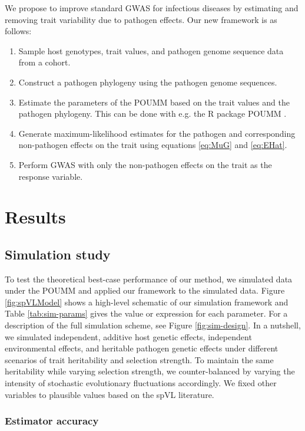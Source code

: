 \documentclass[11pt]{article}
\begin{document}
\begin{linenumbers}
We propose to improve standard GWAS for infectious diseases by estimating and removing trait variability due to pathogen effects. Our new framework is as follows:

\begin{enumerate}
	\item Sample host genotypes, trait values, and pathogen genome sequence data from a cohort.
	\item Construct a pathogen phylogeny using the pathogen genome sequences.
	\item Estimate the parameters of the POUMM based on the trait values and the pathogen phylogeny. This can be done with e.g. the R package POUMM \citep{Mitov2017a-POUMM}.
	\item Generate maximum-likelihood estimates for the pathogen and corresponding non-pathogen effects on the trait using equations \ref{eq:MuG} and \ref{eq:EHat}.
	\item Perform GWAS with only the non-pathogen effects on the trait as the response variable.
\end{enumerate}

\section*{Results}

\subsection*{Simulation study}

To test the theoretical best-case performance of our method, we simulated data under the POUMM and applied our framework to the simulated data. Figure \ref{fig:spVLModel} shows a high-level schematic of our simulation framework and Table \ref{tab:sim-params} gives the value or expression for each parameter. For a description of the full simulation scheme, see Figure \ref{fig:sim-design}. In a nutshell, we simulated independent, additive host genetic effects, independent environmental effects, and heritable pathogen genetic effects under different scenarios of trait heritability and selection strength. To maintain the same heritability while varying selection strength, we counter-balanced by varying the intensity of stochastic evolutionary fluctuations accordingly. We fixed other variables to plausible values based on the spVL literature.

\subsubsection*{Estimator accuracy}


\end{linenumbers}
\end{document}
